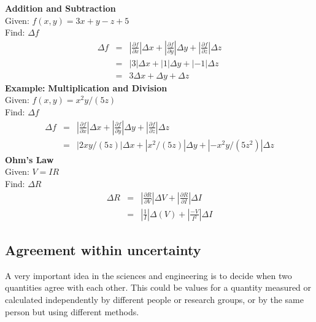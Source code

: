   {\bf Addition and Subtraction} \\
Given: $f(x,y) = 3x+y-z+5$ \\
Find:  $\Delta f$ \\
\begin{eqnarray*}
\Delta  f & = & \left| \frac{\partial f}{\partial x} \right| \Delta x +
           \left| \frac{\partial f}{\partial y} \right| \Delta y +
            \left| \frac{\partial f}{\partial z} \right| \Delta z \\
 & = & \left|3 \right| \Delta x +  \left| 1  \right| \Delta y +\left|-1\right| \Delta z \\  
 & = & 3 \Delta x + \Delta y + \Delta z
\end{eqnarray*}
\noindent
{\bf Example:}  {\bf Multiplication and Division} \\
Given: $f(x,y) = x^2y/(5z)$ \\
Find:  $\Delta f$ \\
\begin{eqnarray*}
\Delta  f & = & \left| \frac{\partial f}{\partial x} \right| \Delta x +
           \left| \frac{\partial f}{\partial y} \right| \Delta y +
            \left| \frac{\partial f}{\partial z} \right| \Delta z \\
& = & \left|2 x y/ (5z)\right| \Delta x +  \left| x^2/(5z) \right| \Delta y +
\left|-x^2y/(5z^2)\right| \Delta z 
\end{eqnarray*}
  {\bf Ohm's Law}\\
Given: $V = IR $ \\
Find:  $\Delta R$ \\
 \begin{eqnarray*}
\Delta R  & = & \left| \frac{\partial R}{\partial V} \right| \Delta V +
           \left| \frac{\partial R}{\partial I} \right| \Delta I \\
  & = & \left| \frac{1}{I} \right| \Delta(V) + \left| \frac{-V}{I^2} \right| \Delta I
\end{eqnarray*}

\subsection{Agreement within uncertainty} %
\label{sec:intro:agreement}
A very important idea in the sciences and engineering is to decide when two quantities agree with each other. This could be values for a quantity measured or calculated independently by different people or research groups, or by the same person but using different methods.

